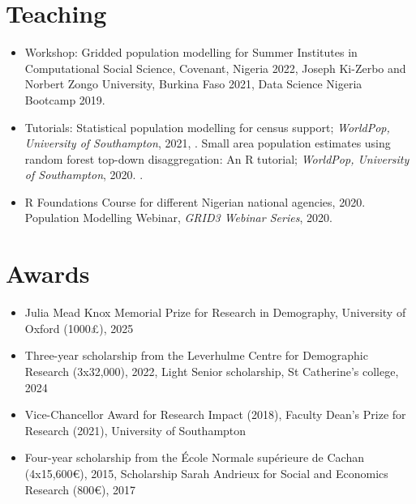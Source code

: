 \documentclass[
]{friggeri-cv}
\begin{document}
\begin{noside}
\section{Teaching}
\begin{itemize}
\item Workshop: Gridded population modelling for Summer Institutes in Computational Social Science, Covenant, Nigeria 2022, Joseph Ki-Zerbo and Norbert Zongo University, Burkina Faso 2021, Data Science Nigeria Bootcamp 2019.
\item  Tutorials: Statistical population modelling for census support; \textit{WorldPop, University of Southampton}, 2021, \href{https://wpgp.github.io/bottom-up-tutorial/}{\scriptsize{}}. Small area population estimates using random forest top-down disaggregation: An R tutorial;   \textit{WorldPop, University of Southampton}, 2020. \href{https://htmlpreview.github.io/?https://github.com/wpgp/top-down-tutorial/blob/master/4_tutorial.html#Suggested_Citation}{\scriptsize{}}.
\item R Foundations Course for different Nigerian national agencies, 2020. Population Modelling Webinar, \textit{GRID3 Webinar Series}, 2020. \href{https://www.youtube.com/watch?v=HMFM8HzLfH8}{\scriptsize{}}
\end{itemize}

\section{Awards}
\begin{itemize}
\item Julia Mead Knox Memorial Prize for Research in Demography, University of Oxford (1000£), 2025
\item Three-year scholarship from the Leverhulme Centre for Demographic Research (3x32,000), 2022, Light Senior scholarship, St Catherine's college, 2024
\item Vice-Chancellor Award for Research Impact (2018), Faculty Dean's Prize for Research (2021), University of Southampton
\item Four-year scholarship from the École Normale supérieure de Cachan (4x15,600€), 2015, Scholarship Sarah Andrieux for Social and Economics Research (800€), 2017
\end{itemize}
\end{noside}
\end{document}
